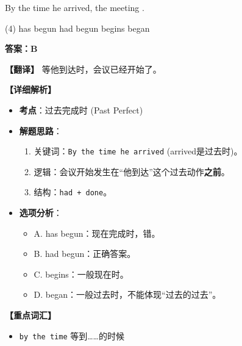 \documentclass[11pt, a4paper]{article}
\newcommand{\analysis}[4]{
    \begin{solutionbox}
        \textbf{答案：#1}
        
        \textbf{【翻译】} #2
        
        \textbf{【详细解析】}
        #3
        
        \textbf{【重点词汇】}
        #4
    \end{solutionbox}
}
\newcommand{\blank}{\underline{\hspace{1.5cm}}}
\begin{document}
\begin{questions}
    \item By the time he arrived, the meeting \blank.
    \begin{tasks}(4)
        \task has begun \task had begun \task begins \task began
    \end{tasks}
    \analysis{B}{等他到达时，会议已经开始了。}{
        \begin{itemize}
            \item \textbf{考点}：过去完成时 (Past Perfect)
            \item \textbf{解题思路}：
                \begin{enumerate}
                    \item 关键词：\texttt{By the time he arrived} (arrived是过去时)。
                    \item 逻辑：会议开始发生在“他到达”这个过去动作\textbf{之前}。
                    \item 结构：\texttt{had + done}。
                \end{enumerate}
            \item \textbf{选项分析}：
                \begin{itemize}
                    \item A. has begun：现在完成时，错。
                    \item B. had begun：正确答案。
                    \item C. begins：一般现在时。
                    \item D. began：一般过去时，不能体现“过去的过去”。
                \end{itemize}
        \end{itemize}
    }{
        \begin{itemize}
            \item \texttt{by the time} 等到……的时候
        \end{itemize}
    }


\end{questions}
\end{document}
